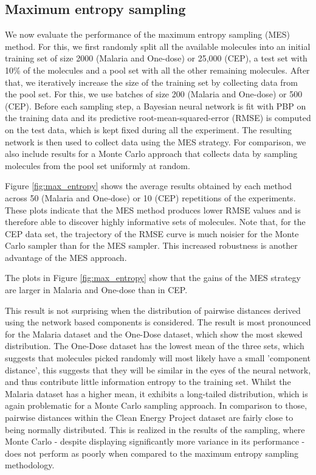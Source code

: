 \subsection{Maximum entropy sampling}

We now evaluate the performance of the maximum entropy sampling (MES) method. For this, we first randomly split all the available molecules into an initial training set of size 2000 (Malaria and One-dose) or 25,000 (CEP), a test set with 10\% of the molecules and a pool set with all the other remaining molecules. After that, we iteratively increase the size of the training set by collecting data from the pool set. For this, we use batches of size 200 (Malaria and One-dose) or 500 (CEP). Before each sampling step, a Bayesian neural network is fit with PBP on the training data and its predictive root-mean-squared-error (RMSE) is computed on the test data, which is kept fixed during all the experiment. The resulting network is then used to collect data using the MES strategy. For comparison, we also include results for a Monte Carlo approach that collects data by sampling molecules from the pool set uniformly at random.

Figure \ref{fig:max_entropy} shows the average results obtained by each method across 50 (Malaria and One-dose) or 10 (CEP) repetitions of the experiments. These plots indicate that the MES method produces lower RMSE values and is therefore able to discover highly informative sets of molecules. Note that, for the CEP data set, the trajectory of the RMSE curve is much noisier for the Monte Carlo sampler than for the MES sampler. This increased robustness is another advantage of the MES approach.


The plots in Figure \ref{fig:max_entropy} show that the gains of the MES strategy are larger in Malaria and One-dose than in CEP. 

This result is not surprising when the distribution of pairwise distances derived using the network based components is considered. The result is most pronounced for the Malaria dataset and the One-Dose dataset, which show the most skewed distribution.  The One-Dose dataset has the lowest mean of the three sets, which suggests that molecules picked randomly will most likely have a small 'component distance', this suggests that they will be similar in the eyes of the neural network, and thus contribute little information entropy to the training set. Whilst the Malaria dataset has a higher mean, it exhibits a long-tailed distribution, which is again problematic for a Monte Carlo sampling approach.  In comparison to those, pairwise distances within the Clean Energy Project dataset are fairly close to being normally distributed.  This is realized in the results of the sampling, where Monte Carlo - despite displaying significantly more variance in its performance - does not perform as poorly when compared to the maximum entropy sampling methodology.


